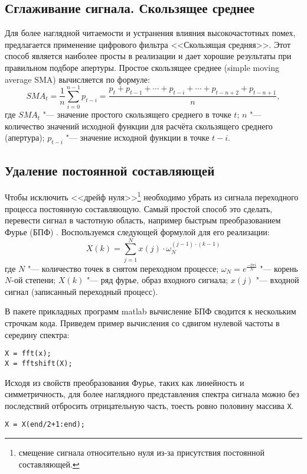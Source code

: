 \subsection{Сглаживание сигнала. Скользящее среднее}\label{subsect:mov_average}

Для более наглядной читаемости и устранения влияния высокочастотных помех, предлагается применение цифрового фильтра <<Скользящая средняя>>. Этот способ является наиболее просты в реализации и дает хорошие результаты при правильном подборе апертуры. Простое скользящее среднее (simple moving average SMA) вычисляется по формуле:
\begin{equation}\label{eq:SMA}
SMA_t=\frac{1}{n}\sum_{i=0}^{n-1}p_{t-i}=\frac{p_t+p_{t-1}+\cdots+p_{t-i}+\cdots+p_{t-n+2}+p_{t-n+1}}{n},
\end{equation}
где $ SMA_t $ "--- значение простого скользящего среднего в точке $ t $; $ n $ "--- количество значений исходной функции для расчёта скользящего среднего (апертура); $ p_{t-i} $ "--- значение исходной функции в точке $ t-i $.

\subsection{Удаление постоянной составляющей}\label{subsect:clear_offset}

Чтобы исключить <<дрейф нуля>>\footnote{смещение сигнала относительно нуля из-за присутствия постоянной составляющей.} необходимо убрать из сигнала переходного процесса постоянную составляющую. Самый простой способ это сделать, перевести сигнал в частотную область, например быстрым преобразованием Фурье (БПФ) \cite{BPF,BPFEng}. Воспользуемся следующей формулой для его реализации:
\begin{equation}\label{eq:FFT}
X(k)=\sum_{j=1}^{N} x(j)\cdot\omega_{N}^{(j-1)\cdot(k-1)}
\end{equation}
где $ N $ "--- количество точек в снятом переходном процессе; $ \omega_{N} = e^{\frac{-2\pi i}{N}} $ "--- корень $ N $-ой степени; $ X(k) $ "--- ряд фурье, образ входного сигнала; $ x(j) $ "--- входной сигнал (записанный переходный процесс).

В пакете прикладных программ matlab вычисление БПФ сводится к нескольким строчкам кода. Приведем пример вычисления со сдвигом нулевой частоты в середину спектра:
\begin{lstlisting}[stepnumber=0]
X = fft(x);
X = fftshift(X);
\end{lstlisting}

Исходя из свойств преобразования Фурье, таких как линейность и симметричность, для более наглядного представления спектра сигнала можно без последствий отбросить отрицательную часть, тоесть ровно половину массива \verb|X|. 
\begin{lstlisting}[stepnumber=0]
X = X(end/2+1:end);
\end{lstlisting}

